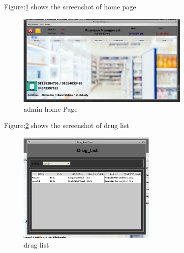 \documentclass[12pt, letter paper]{report}
\begin{document}
Figure:\ref{fig:2.png} shows the screenshot of home page
\begin{figure}[h]
 \centering
 \includegraphics[width=0.75\textwidth]{2.png}
 \caption{admin home Page}
 \label{fig:2.png}
\end{figure}
\newpage
Figure:\ref{fig:druglist.png} shows the screenshot of drug list
\begin{figure}[h]
	\centering
	\includegraphics[width=0.6\textwidth]{druglist.png}
	\caption{drug list}
	\label{fig:druglist.png}
\end{figure}
\end{document}
